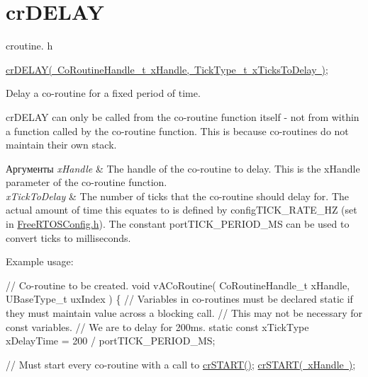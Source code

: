 \hypertarget{group__cr_d_e_l_a_y}{}\section{cr\+D\+E\+L\+AY}
\label{group__cr_d_e_l_a_y}
croutine. h 
\begin{DoxyPre}
\mbox{\hyperlink{croutine_8h_a05a06feb11028f2d1d440ea335f562ba}{crDELAY( CoRoutineHandle\_t xHandle, TickType\_t xTicksToDelay )}};\end{DoxyPre}


Delay a co-\/routine for a fixed period of time.

cr\+D\+E\+L\+AY can only be called from the co-\/routine function itself -\/ not from within a function called by the co-\/routine function. This is because co-\/routines do not maintain their own stack.


\begin{DoxyParams}{Аргументы}
{\em x\+Handle} & The handle of the co-\/routine to delay. This is the x\+Handle parameter of the co-\/routine function.\\
\hline
{\em x\+Tick\+To\+Delay} & The number of ticks that the co-\/routine should delay for. The actual amount of time this equates to is defined by config\+T\+I\+C\+K\+\_\+\+R\+A\+T\+E\+\_\+\+HZ (set in \mbox{\hyperlink{_free_r_t_o_s_config_8h}{Free\+R\+T\+O\+S\+Config.\+h}}). The constant port\+T\+I\+C\+K\+\_\+\+P\+E\+R\+I\+O\+D\+\_\+\+MS can be used to convert ticks to milliseconds.\\
\hline
\end{DoxyParams}
Example usage\+: 
\begin{DoxyPre}
// Co-routine to be created.
void vACoRoutine( CoRoutineHandle\_t xHandle, UBaseType\_t uxIndex )
\{
// Variables in co-routines must be declared static if they must maintain value across a blocking call.
// This may not be necessary for const variables.
// We are to delay for 200ms.
static const xTickType xDelayTime = 200 / portTICK\_PERIOD\_MS;\end{DoxyPre}



\begin{DoxyPre}    // Must start every co-routine with a call to \mbox{\hyperlink{croutine_8h_a19a57a201a325e8af1207ed68c4aedde}{crSTART()}};
    \mbox{\hyperlink{croutine_8h_a19a57a201a325e8af1207ed68c4aedde}{crSTART( xHandle )}};\end{DoxyPre}



